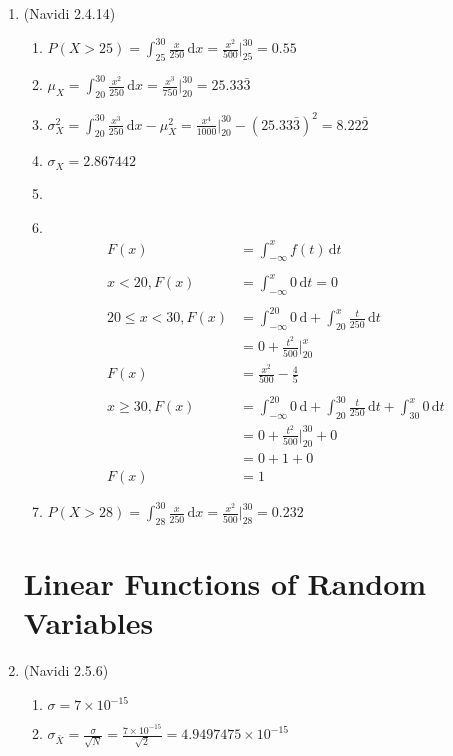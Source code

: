 \documentclass[11pt]{article}
\newcommand\Item[1][]{%
  \ifx\relax#1\relax  \item \else \item[#1] \fi
  \abovedisplayskip=0pt\abovedisplayshortskip=0pt~\vspace*{-\baselineskip}}
\begin{document}
\begin{enumerate}
        \item (Navidi 2.4.14) %
        \begin{enumerate}
                \item %
                $P(X > 25) = \int_{25}^{30}\frac{x}{250} \,\mathrm{d}x = \frac{x^{2}}{500}\Big|_{25}^{30} = 0.55$
                \item %
                $\mu_{X} = \int_{20}^{30}\frac{x^{2}}{250} \,\mathrm{d}x = \frac{x^{3}}{750}\Big|_{20}^{30} = 25.33\bar{3}$
                \item %
                $\sigma_{X}^{2} = \int_{20}^{30}\frac{x^{3}}{250} \,\mathrm{d}x - \mu_{X}^{2} = \frac{x^{4}}{1000}\Big|_{20}^{30} - (25.33\bar{3})^{2} = 8.22\bar{2}$
                \item %
                $\sigma_{X} = 2.867442$
                \Item
                \begin{align*}
                        F(x) &= \int_{-\infty}^{x}f(t) \, \mathrm{d}t \\ \\ %
                        x < 20, F(x) &= \int_{-\infty}^{x} 0 \, \mathrm{d}t = 0 \\ \\%
                        20 \le x < 30, F(x) &= \int_{-\infty}^{20} 0 \, \mathrm{d}+ \int_{20}^{x} \frac{t}{250} \, \mathrm{d}t \\ %
                                            &= 0 + \frac{t^{2}}{500}\Big|_{20}^{x} \\
                                       F(x) &= \frac{x^{2}}{500} - \frac{4}{5} \\ \\
                        x \ge 30, F(x) &= \int_{-\infty}^{20} 0 \, \mathrm{d} + \int_{20}^{30} \frac{t}{250} \, \mathrm{d}t + \int_{30}^{x} 0 \, \mathrm{d}t \\ %
                                       &= 0 + \frac{t^{2}}{500}\Big|_{20}^{30} + 0 \\
                                       &= 0 + 1 + 0 \\
                                  F(x) &= 1
                \end{align*}
                \item %
                $P(X > 28) = \int_{28}^{30}\frac{x}{250} \,\mathrm{d}x = \frac{x^{2}}{500}\Big|_{28}^{30} = 0.232$
        \end{enumerate}

\section*{Linear Functions of Random Variables}
        \item (Navidi 2.5.6)
        \begin{enumerate}
                \item[] $\sigma = 7 \times10^{-15}$ 
                \item[] $\sigma_{\bar{X}} = \frac{\sigma}{\sqrt{N}} = \frac{7 \times10^{-15}}{\sqrt{2}} =4.9497475 \times 10^{-15}$ 
        \end{enumerate}
\end{enumerate}
\end{document}
